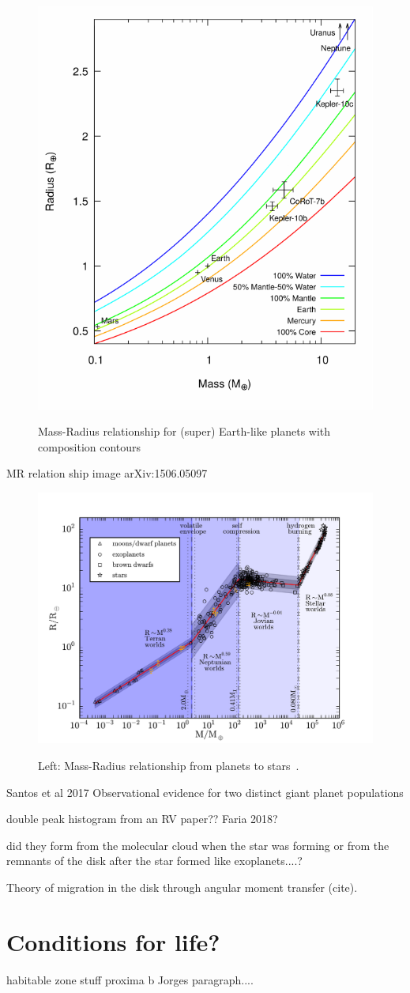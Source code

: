 \begin{figure}[t]
    \centering
    \includegraphics[width=0.4\linewidth]{./figures/introduction/Mass_radius_relation-compostion_Brugger_2017.pdf}\\
    \caption{Mass-Radius relationship for (super) Earth-like planets with composition contours~\citet{brugger_constraints_2017}}
    \label{fig:mass_radius_relation_composition}
\end{figure}

MR relation ship image arXiv:1506.05097~\citet{chen_probabilistic_2016}

\begin{figure}[t]
    \centering
    \includegraphics[width=0.9\linewidth]{./figures/introduction/mass_radius_relation.pdf}  \\
    \caption{Left: Mass-Radius relationship from planets to stars~\citet{chen_probabilistic_2016}.}
    \label{fig:mass_radius_relation}
\end{figure}


\citep{santos_observational_2017} Santos et al 2017   Observational evidence for two distinct giant planet populations
 

double peak histogram from an {RV} paper?? Faria 2018?


did they form from the molecular cloud when the star was forming or from the remnants of the disk after the star formed like exoplanets....?


Theory of migration in the disk through  angular moment transfer (cite).


\section{Conditions for life?}
habitable zone stuff
proxima b
Jorges paragraph....
